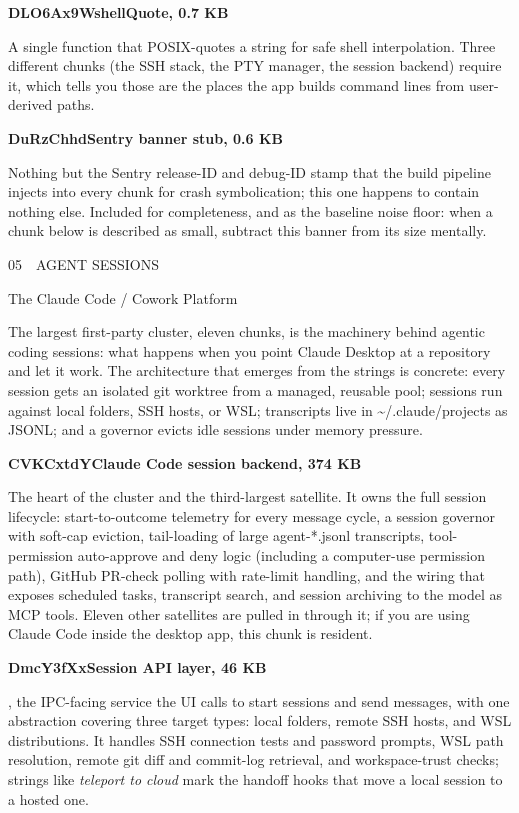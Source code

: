 \documentclass[11pt]{article}
\newcommand{\mono}{\ttfamily}
\newcommand{\reppar}[1]{{\fontsize{10.5}{15.2}\selectfont #1\par}\vspace{8pt}}
\newcommand{\code}[1]{{\mono\small #1}}
\newcommand{\reportsection}[3]{%
  \vspace{14pt}%
  {\mono\footnotesize\color{baseMid}\addfontfeatures{LetterSpace=8.0}\MakeUppercase{#1\, \textbullet\, #2}}\par
  \vspace{3pt}%
  {\heavy\fontsize{17}{19}\selectfont\color{base900} #3\par}
  \vspace{4pt}{\color{accent}\hrule height 1.6pt}\vspace{9pt}%
}
\newcommand{\chunkhead}[2]{%
  \vspace{4pt}%
  {\fontsize{10.5}{15.2}\selectfont
   {\mono\bfseries\color{accentink}#1}\;\textbullet\;\textbf{#2}\par}
  \vspace{2pt}}
\begin{document}
\chunkhead{DLO6Ax9W}{shellQuote, 0.7 KB}
\reppar{A single function that POSIX-quotes a string for safe shell interpolation. Three different chunks (the SSH stack, the PTY manager, the session backend) require it, which tells you those are the places the app builds command lines from user-derived paths.}

\chunkhead{DuRzChhd}{Sentry banner stub, 0.6 KB}
\reppar{Nothing but the Sentry release-ID and debug-ID stamp that the build pipeline injects into every chunk for crash symbolication; this one happens to contain nothing else. Included for completeness, and as the baseline noise floor: when a chunk below is described as small, subtract this banner from its size mentally.}

\reportsection{05}{Agent Sessions}{The Claude Code / Cowork Platform}

\reppar{The largest first-party cluster, eleven chunks, is the machinery behind agentic coding sessions: what happens when you point Claude Desktop at a repository and let it work. The architecture that emerges from the strings is concrete: every session gets an isolated git worktree from a managed, reusable pool; sessions run against local folders, SSH hosts, or WSL; transcripts live in \code{\textasciitilde/.claude/projects} as JSONL; and a governor evicts idle sessions under memory pressure.}

\chunkhead{CVKCxtdY}{Claude Code session backend, 374 KB}
\reppar{The heart of the cluster and the third-largest satellite. It owns the full session lifecycle: start-to-outcome telemetry for every message cycle, a session governor with soft-cap eviction, tail-loading of large \code{agent-*.jsonl} transcripts, tool-permission auto-approve and deny logic (including a computer-use permission path), GitHub PR-check polling with rate-limit handling, and the wiring that exposes scheduled tasks, transcript search, and session archiving to the model as MCP tools. Eleven other satellites are pulled in through it; if you are using Claude Code inside the desktop app, this chunk is resident.}

\chunkhead{DmcY3fXx}{Session API layer, 46 KB}
\reppar{\code{createLocalSessionsApi}, the IPC-facing service the UI calls to start sessions and send messages, with one abstraction covering three target types: local folders, remote SSH hosts, and WSL distributions. It handles SSH connection tests and password prompts, WSL path resolution, remote git diff and commit-log retrieval, and workspace-trust checks; strings like \textit{teleport to cloud} mark the handoff hooks that move a local session to a hosted one.}
\end{document}
